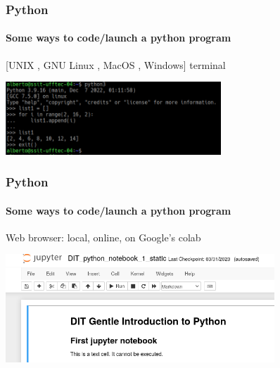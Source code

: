 \documentclass[xcolor=x11names]{beamer}
\begin{document}
\begin{frame}
\frametitle{Python}
\framesubtitle{Some ways to code/launch a python program}

[UNIX , GNU Linux , MacOS , Windows] terminal

\begin{center}
 \includegraphics[width=81mm]{img/python_on_konsole.png}
\end{center}
\end{frame}

\begin{frame}
\frametitle{Python}
\framesubtitle{Some ways to code/launch a python program}

Web browser: local, online, on Google's colab

\begin{center}
 \includegraphics[width=101mm]{img/python_on_jupyter.png}
\end{center}
\end{frame}
 
\end{document}
